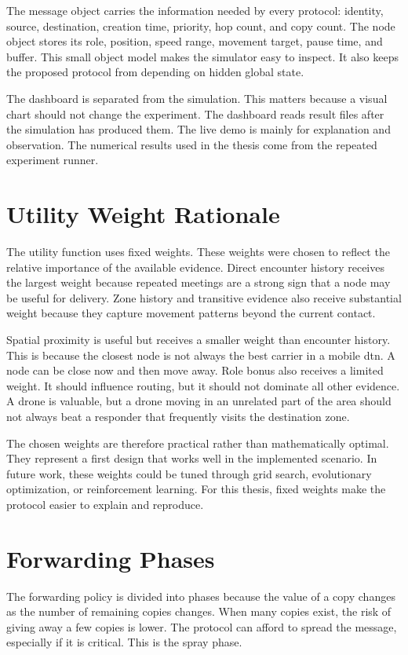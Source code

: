 The message object carries the information needed by every protocol: identity, source, destination, creation time, priority, hop count, and copy count. The node object stores its role, position, speed range, movement target, pause time, and buffer. This small object model makes the simulator easy to inspect. It also keeps the proposed protocol from depending on hidden global state.

The dashboard is separated from the simulation. This matters because a visual chart should not change the experiment. The dashboard reads result files after the simulation has produced them. The live demo is mainly for explanation and observation. The numerical results used in the thesis come from the repeated experiment runner.

\section{Utility Weight Rationale}
The utility function uses fixed weights. These weights were chosen to reflect the relative importance of the available evidence. Direct encounter history receives the largest weight because repeated meetings are a strong sign that a node may be useful for delivery. Zone history and transitive evidence also receive substantial weight because they capture movement patterns beyond the current contact.

Spatial proximity is useful but receives a smaller weight than encounter history. This is because the closest node is not always the best carrier in a mobile \ac{dtn}. A node can be close now and then move away. Role bonus also receives a limited weight. It should influence routing, but it should not dominate all other evidence. A drone is valuable, but a drone moving in an unrelated part of the area should not always beat a responder that frequently visits the destination zone.

The chosen weights are therefore practical rather than mathematically optimal. They represent a first design that works well in the implemented scenario. In future work, these weights could be tuned through grid search, evolutionary optimization, or reinforcement learning. For this thesis, fixed weights make the protocol easier to explain and reproduce.

\section{Forwarding Phases}
The forwarding policy is divided into phases because the value of a copy changes as the number of remaining copies changes. When many copies exist, the risk of giving away a few copies is lower. The protocol can afford to spread the message, especially if it is critical. This is the spray phase.

